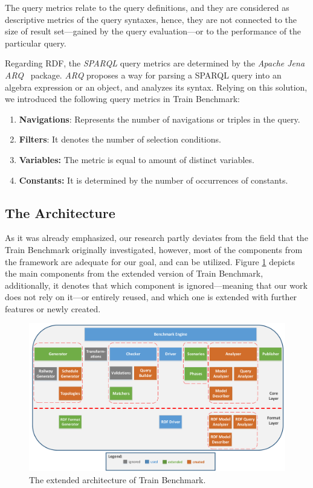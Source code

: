 The query metrics relate to the query definitions, and they are considered as descriptive metrics of the query syntaxes, hence, they are not connected to the size of result set---gained by the query evaluation---or to the performance of the particular query.

Regarding RDF, the \textit{SPARQL} query metrics are determined by the \textit{Apache Jena ARQ}~\cite{jena} package. \textit{ARQ} proposes a way for parsing a SPARQL query into an algebra expression or an object, and analyzes its syntax. Relying on this solution, we introduced the following query metrics in Train Benchmark:
\begin{enumerate}
	\item{\textbf{Navigations}}: Represents the number of navigations or triples in the query.
	\item{\textbf{Filters}}: It denotes the number of selection conditions.
	\item{\textbf{Variables:}} The metric is equal to amount of distinct variables.
	\item{\textbf{Constants:}} It is determined by the number of occurrences of constants.
\end{enumerate}
\subsection{The Architecture}

As it was already emphasized, our research partly deviates from the field that the Train Benchmark originally investigated, however, most of the components from the framework are adequate for our goal, and can be utilized. Figure \ref{fig:architecture} depicts the main components from the extended version of Train Benchmark, additionally, it denotes that which component is ignored---meaning that our work does not rely on it---or entirely reused, and which one is extended with further features or newly created.

\begin{figure}[!ht]
	\centering
	\includegraphics[width=150mm, keepaspectratio]{figures/architecture.pdf}
	\caption{The extended architecture of Train Benchmark.}
	\label{fig:architecture}
\end{figure}

